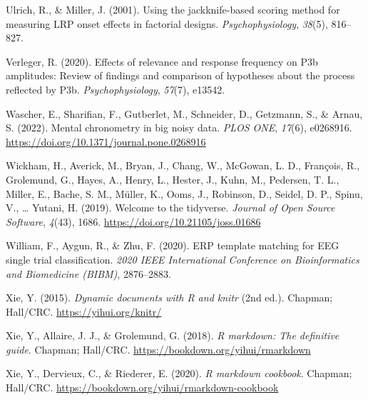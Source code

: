 \documentclass[
  man]{apa7}
\newlength{\cslhangindent}
\newlength{\cslentryspacingunit} %
\newenvironment{CSLReferences}[2] %
 {%
  \setlength{\parindent}{0pt}
  \ifodd #1
  \let\oldpar\par
  \def\par{\hangindent=\cslhangindent\oldpar}
  \fi
  \setlength{\parskip}{#2\cslentryspacingunit}
 }%
 {}
\begin{document}
\begin{CSLReferences}{1}{0}
\leavevmode{}%
Ulrich, R., \& Miller, J. (2001). Using the jackknife-based scoring method for measuring {LRP} onset effects in factorial designs. \emph{Psychophysiology}, \emph{38}(5), 816--827.

\leavevmode{}%
Verleger, R. (2020). Effects of relevance and response frequency on {P3b} amplitudes: {Review} of findings and comparison of hypotheses about the process reflected by {P3b}. \emph{Psychophysiology}, \emph{57}(7), e13542.

\leavevmode{}%
Wascher, E., Sharifian, F., Gutberlet, M., Schneider, D., Getzmann, S., \& Arnau, S. (2022). Mental chronometry in big noisy data. \emph{PLOS ONE}, \emph{17}(6), e0268916. \url{https://doi.org/10.1371/journal.pone.0268916}

\leavevmode{}%
Wickham, H., Averick, M., Bryan, J., Chang, W., McGowan, L. D., François, R., Grolemund, G., Hayes, A., Henry, L., Hester, J., Kuhn, M., Pedersen, T. L., Miller, E., Bache, S. M., Müller, K., Ooms, J., Robinson, D., Seidel, D. P., Spinu, V., \ldots{} Yutani, H. (2019). Welcome to the {tidyverse}. \emph{Journal of Open Source Software}, \emph{4}(43), 1686. \url{https://doi.org/10.21105/joss.01686}

\leavevmode{}%
William, F., Aygun, R., \& Zhu, F. (2020). {ERP} template matching for {EEG} single trial classification. \emph{2020 {IEEE} International Conference on Bioinformatics and Biomedicine ({BIBM})}, 2876--2883.

\leavevmode{}%
Xie, Y. (2015). \emph{Dynamic documents with {R} and knitr} (2nd ed.). Chapman; Hall/CRC. \url{https://yihui.org/knitr/}

\leavevmode{}%
Xie, Y., Allaire, J. J., \& Grolemund, G. (2018). \emph{R markdown: The definitive guide}. Chapman; Hall/CRC. \url{https://bookdown.org/yihui/rmarkdown}

\leavevmode{}%
Xie, Y., Dervieux, C., \& Riederer, E. (2020). \emph{R markdown cookbook}. Chapman; Hall/CRC. \url{https://bookdown.org/yihui/rmarkdown-cookbook}

\end{CSLReferences}

\newpage
\end{document}
